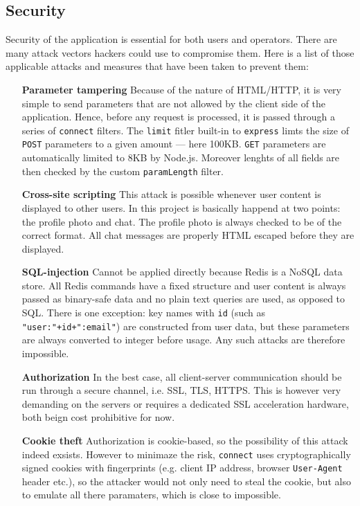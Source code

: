 \documentclass[12pt,oneside]{fithesis}
\begin{document}
	\subsection{Security}
		Security of the application is essential for both users and operators. There are many attack vectors hackers could use to compromise them. \cite{paper:dd} Here is a list of those applicable attacks and measures that have been taken to prevent them:
		\begin{itemize}
			\item[\textbf{Parameter tampering}] 
				Because of the nature of HTML/HTTP, it is very simple to send parameters that are not allowed by the client side of the application. Hence, before any request is processed, it is passed through a series of \texttt{connect} filters. The \texttt{limit} fitler built-in to \texttt{express} limts the size of \texttt{POST} parameters to a given amount --- here 100KB. \texttt{GET} parameters are automatically limited to 8KB by Node.js. Moreover lenghts of all fields are then checked by the custom \texttt{paramLength} filter. 
			\item[\textbf{Cross-site scripting}] 
				This attack is possible whenever user content is displayed to other users. In this project is basically happend at two points: the profile photo and chat. The profile photo is always checked to be of the correct format. All chat messages are properly HTML escaped before they are displayed.
			\item[\textbf{SQL-injection}]
				Cannot be applied directly because Redis is a NoSQL data store. All Redis commands have a fixed structure and user content is always passed as binary-safe data and no plain text queries are used, as opposed to SQL. There is one exception: key names with \texttt{id} (such as \texttt{"user:"+id+":email"}) are constructed from user data, but these parameters are always converted to integer before usage. Any such attacks are therefore impossible.
			\item[\textbf{Authorization}] In the best case, all client-server communication should be run through a secure channel, i.e. SSL, TLS, HTTPS. This is however very demanding on the servers or requires a dedicated SSL acceleration hardware, both beign cost prohibitive for now.
			\item[\textbf{Cookie theft}]
				Authorization is cookie-based, so the possibility of this attack indeed exsists. However to minimaze the risk, \texttt{connect} uses cryptographically signed cookies with fingerprints (e.g. client IP address, browser \texttt{User-Agent} header etc.), so the attacker would not only need to steal the cookie, but also to emulate all there paramaters, which is close to impossible.				
		\end{itemize}		
\end{document}
